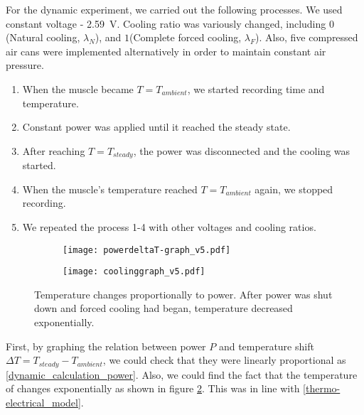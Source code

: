 For the dynamic experiment, we carried out the following processes. We used constant voltage - \SI{2.59}{\volt}. Cooling ratio was variously changed, including $0$(Natural cooling, $\lambda_{N}$), and $1$(Complete forced cooling, $\lambda_{F}$). Also, five compressed air cans were implemented alternatively in order to maintain constant air pressure. 
\begin{enumerate}
\item When the muscle became $T=T_{ambient}$, we started recording time and temperature.
\item Constant power was applied until it reached the steady state.
\item After reaching $T=T_{steady}$, the power was disconnected and the cooling was started. 
\item When the muscle's temperature reached $T=T_{ambient}$ again, we stopped recording. 
\item We repeated the process 1-4 with other voltages and cooling ratios.
\end{enumerate}


\begin{figure}[t]
	\centering
	\begin{subfigure}[t]{0.45\linewidth}
		\centering\texttt{[image: powerdeltaT-graph\_v5.pdf]}
		\caption{\label{powerdeltaT}}
	\end{subfigure}%
	\begin{subfigure}[t]{0.45\linewidth}
		\centering\texttt{[image: coolinggraph\_v5.pdf]}
		\caption{\label{coolinggraph}}
	\end{subfigure}
	\caption[Results of the dynamic experiment]{ Temperature changes proportionally to power.  After power was shut down and forced cooling had began, temperature decreased exponentially.}
	\label{result_dynamic}
\end{figure}

First, by graphing the relation between power $P$ and temperature shift $\Delta{T}=T_{steady}-T_{ambient}$, we could check that they were linearly proportional as \eqref{dynamic_calculation_power}.
Also, we could find the fact that the temperature of \scp changes exponentially as shown in figure \ref{coolinggraph}. This was in line with  \eqref{thermo-electrical_model}.

